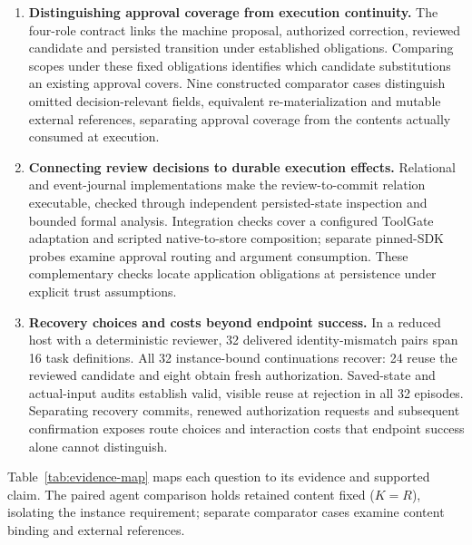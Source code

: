 \documentclass[pdflatex,sn-basic]{sn-jnl}
\begin{document}
\begin{enumerate}
\item \textbf{Distinguishing approval coverage from execution continuity.} The four-role contract links the machine proposal, authorized correction, reviewed candidate and persisted transition under established obligations. Comparing scopes under these fixed obligations identifies which candidate substitutions an existing approval covers. Nine constructed comparator cases distinguish omitted decision-relevant fields, equivalent re-materialization and mutable external references, separating approval coverage from the contents actually consumed at execution.
\item \textbf{Connecting review decisions to durable execution effects.} Relational and event-journal implementations make the review-to-commit relation executable, checked through independent persisted-state inspection and bounded formal analysis. Integration checks cover a configured ToolGate adaptation and scripted native-to-store composition; separate pinned-SDK probes examine approval routing and argument consumption. These complementary checks locate application obligations at persistence under explicit trust assumptions.
\item \textbf{Recovery choices and costs beyond endpoint success.} In a reduced host with a deterministic reviewer, 32 delivered identity-mismatch pairs span 16 task definitions. All 32 instance-bound continuations recover: 24 reuse the reviewed candidate and eight obtain fresh authorization. Saved-state and actual-input audits establish valid, visible reuse at rejection in all 32 episodes. Separating recovery commits, renewed authorization requests and subsequent confirmation exposes route choices and interaction costs that endpoint success alone cannot distinguish.
\end{enumerate}

Table~\ref{tab:evidence-map} maps each question to its evidence and supported claim. The paired agent comparison holds retained content fixed ($K=R$), isolating the instance requirement; separate comparator cases examine content binding and external references.
\end{document}
